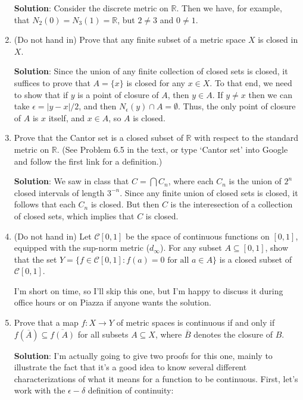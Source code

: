 \documentclass[letterpaper,12pt]{article}
\newcommand{\abs}[1]{\lvert #1\rvert}
\newcommand{\R}{\mathbb{R}}
\begin{document}
\begin{enumerate}
\bigskip

{\bf Solution}: Consider the discrete metric on $\R$. Then we have, for example, that $N_2(0)=N_3(1) = \R$, but $2\neq 3$ and $0\neq 1$. 

\item (Do not hand in) Prove that any finite subset of a metric space $X$ is closed in $X$.

\bigskip

{\bf Solution}: Since the union of any finite collection of closed sets is closed, it suffices to prove that $A=\{x\}$ is closed for any $x\in X$. To that end, we need to show that if $y$ is a point of closure of $A$, then $y\in A$. If $y\neq x$ then we can take $\epsilon = \abs{y-x}/2$, and then $N_\epsilon(y)\cap A = \emptyset$. Thus, the only point of closure of $A$ is $x$ itself, and $x\in A$, so $A$ is closed.

\item Prove that the Cantor set is a closed subset of $\R$ with respect to the standard metric on $\R$. (See Problem 6.5 in the text, or type `Cantor set' into Google and follow the first link for a definition.)

\bigskip

{\bf Solution}: We saw in class that $C = \bigcap C_n$, where each $C_n$ is the union of $2^n$ closed intervals of length $3^{-n}$. Since any finite union of closed sets is closed, it follows that each $C_n$ is closed. But then $C$ is the interesection of a collection of closed sets, which implies that $C$ is closed.

\item (Do not hand in) Let $\mathcal{C}[0,1]$ be the space of continuous functions on $[0,1]$, equipped with the sup-norm metric ($d_\infty$). For any subset $A\subseteq [0,1]$, show that the set $Y=\{f\in \mathcal{C}[0,1] : f(a)=0 \text{ for all } a\in A\}$ is a closed subset of $\mathcal{C}[0,1]$.

\bigskip

I'm short on time, so I'll skip this one, but I'm happy to discuss it during office hours or on Piazza if anyone wants the solution.

\item Prove that a map $f:X\to Y$ of metric spaces is continuous if and only if $f(\overline{A})\subseteq \overline{f(A)}$ for all subsets $A\subseteq X$, where $\overline{B}$ denotes the closure of $B$.

\bigskip

{\bf Solution}: I'm actually going to give two proofs for this one, mainly to illustrate the fact that it's a good idea to know several different characterizations of what it means for a function to be continuous. First, let's work with the $\epsilon-\delta$ definition of continuity:


\end{enumerate}
\end{document}
